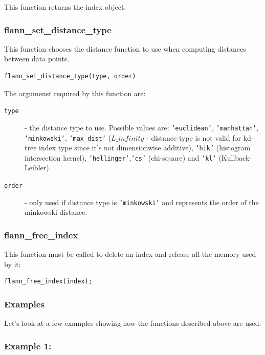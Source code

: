 \documentclass[letter,10pt]{article}
\begin{document}
This function returns the index object.


\subsubsection{flann\_set\_distance\_type}
\label{matlab:flannSetDistanceType}

This function chooses the distance function to use when computing distances between
data points.
\begin{Verbatim}[fontsize=\footnotesize,frame=single]
flann_set_distance_type(type, order)
\end{Verbatim}
The argumenst required by this function are:
\begin{description}
\item[\texttt{type}] - the distance type to use. Possible values are: \texttt{'euclidean'},
		      \texttt{'manhattan'}, \texttt{'minkowski'}, \texttt{'max\_dist'} ($L\_{infinity}$ - distance
type is not valid for kd-tree index type since it's not dimensionwise additive), 
\texttt{'hik'} (histogram intersection kernel), \texttt{'hellinger'},\texttt{'cs'} (chi-square) and \texttt{'kl'} (Kullback-Leibler).

\item[\texttt{order}] - only used if distance type is \texttt{'minkowski'} and represents the order
	      of the minkowski distance.
\end{description}



\subsubsection{flann\_free\_index}

This function must be called to delete an index and release all the memory
used by it:
\begin{Verbatim}[fontsize=\footnotesize,frame=single]
flann_free_index(index);
\end{Verbatim}

\subsubsection{Examples}

Let's look at a few examples showing how the functions described above are
used:

\subsubsection{Example 1:}
\end{document}
